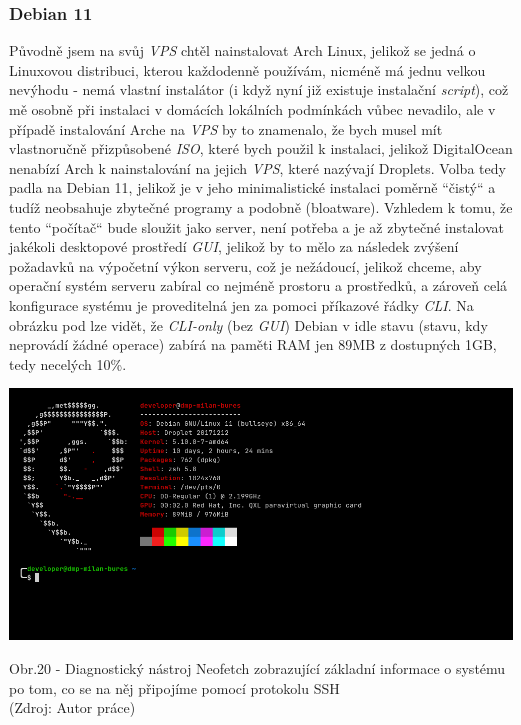 \documentclass[12pt,a4paper]{report}
\begin{document}
  \subsubsection{Debian 11}
  Původně jsem na svůj \emph{VPS} chtěl nainstalovat Arch Linux, jelikož se jedná o Linuxovou distribuci, kterou každodenně používám, nicméně má jednu velkou
  nevýhodu - nemá vlastní instalátor (i když nyní již existuje instalační \emph{script}), což mě osobně při
  instalaci v domácích lokálních podmínkách vůbec nevadilo, ale v případě instalování Arche na \emph{VPS}
  by to znamenalo, že bych musel mít vlastnoručně přizpůsobené \emph{ISO}, které bych použil k instalaci,
  jelikož DigitalOcean nenabízí Arch k nainstalování na jejich \emph{VPS}, které nazývají Droplets.
  Volba tedy padla na Debian 11, jelikož je v jeho minimalistické instalaci poměrně ``čistý`` \space a tudíž
  neobsahuje zbytečné programy a podobně (bloatware). Vzhledem k tomu, že tento ``počítač`` \space bude
  sloužit jako server, není potřeba a je až zbytečné instalovat jakékoli desktopové prostředí \emph{GUI},
  jelikož by to mělo za následek zvýšení požadavků na výpočetní
  výkon serveru, což je nežádoucí, jelikož chceme, aby operační systém serveru zabíral co nejméně
  prostoru a prostředků, a zároveň celá konfigurace systému je proveditelná jen za pomoci
  příkazové řádky \emph{CLI}. Na obrázku pod lze vidět, že \emph{CLI-only} (bez \emph{GUI}) Debian v idle
  stavu (stavu, kdy neprovádí žádné operace) zabírá na paměti RAM jen 89MB z dostupných 1GB,
  tedy necelých 10\%.

  \vspace*{0.5cm}
  \noindent\includegraphics[width=\linewidth]{VPS.png}
  \begin{center}
    Obr.20 -  Diagnostický nástroj Neofetch zobrazující základní informace o systému po tom, co se na něj připojíme pomocí protokolu SSH  \\
    (Zdroj: Autor práce)
  \end{center}
  \vspace*{0.5cm}
\end{document}
